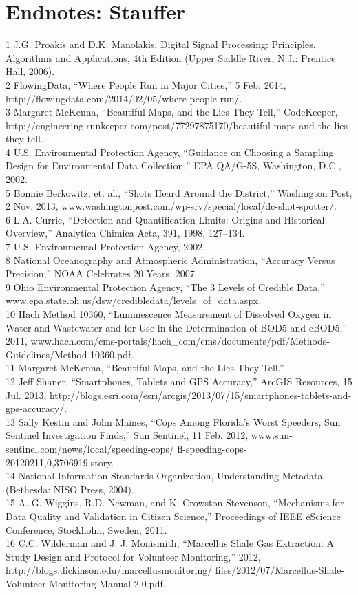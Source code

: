 \section{Endnotes: Stauffer}
1 J.G. Proakis and D.K. Manolakis, Digital Signal Processing: Principles, Algorithms and Applications,
4th Edition (Upper Saddle River, N.J.: Prentice Hall, 2006).\\
2 FlowingData, ``Where People Run in Major Cities,'' 5 Feb. 2014,
http://flowingdata.com/2014/02/05/where-people-run/.\\
3 Margaret McKenna, ``Beautiful Maps, and the Lies They Tell,'' CodeKeeper,
http://engineering.runkeeper.com/post/77297875170/beautiful-maps-and-the-lies-they-tell.\\
4 U.S. Environmental Protection Agency, ``Guidance on Choosing a Sampling Design for
Environmental Data Collection,'' EPA QA/G-5S, Washington, D.C., 2002.\\
5 Bonnie Berkowitz, et. al., ``Shots Heard Around the District,'' Washington Post, 2 Nov. 2013,
www.washingtonpost.com/wp-srv/special/local/dc-shot-spotter/.\\
6 L.A. Currie, ``Detection and Quantification Limits: Origins and Historical Overview,''
Analytica Chimica Acta, 391, 1998, 127–134.\\
7 U.S. Environmental Protection Agency, 2002.\\
8 National Oceanography and Atmospheric Administration, ``Accuracy Versus Precision,''
NOAA Celebrates 20 Years, 2007.\\
9 Ohio Environmental Protection Agency, ``The 3 Levels of Credible Data,''
www.epa.state.oh.us/dsw/credibledata/levels_of_data.aspx.\\
10 Hach Method 10360, ``Luminescence Measurement of Dissolved Oxygen in Water and Wastewater
and for Use in the Determination of BOD5 and cBOD5,'' 2011, www.hach.com/cms-portals/hach_com/cms/documents/pdf/Methods-Guidelines/Method-10360.pdf.\\
11 Margaret McKenna, ``Beautiful Maps, and the Lies They Tell.''\\
12 Jeff Shaner, ``Smartphones, Tablets and GPS Accuracy,'' ArcGIS Resources, 15 Jul. 2013,
http://blogs.esri.com/esri/arcgis/2013/07/15/smartphones-tablets-and-gps-accuracy/.\\
13 Sally Kestin and John Maines, ``Cops Among Florida's Worst Speeders, Sun Sentinel Investigation
Finds,'' Sun Sentinel, 11 Feb. 2012, www.sun-sentinel.com/news/local/speeding-cops/
fl-speeding-cops-20120211,0,3706919.story.\\
14 National Information Standards Organization, Understanding Metadata
(Bethesda: NISO Press, 2004).\\
15 A. G. Wiggins, R.D. Newman, and K. Crowston Stevenson, ``Mechanisms for Data Quality and
Validation in Citizen Science,'' Proceedings of IEEE eScience Conference, Stockholm, Sweden, 2011.\\
16 C.C. Wilderman and J. J. Monismith, ``Marcellus Shale Gas Extraction: A Study Design and
Protocol for Volunteer Monitoring,'' 2012, http://blogs.dickinson.edu/marcellusmonitoring/
files/2012/07/Marcellus-Shale-Volunteer-Monitoring-Manual-2.0.pdf.\\

